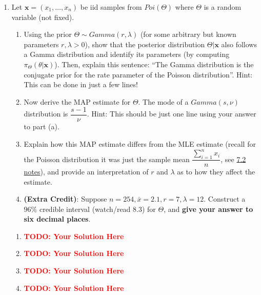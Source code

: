\documentclass[12pt]{article}
\def\todo#1{\textcolor{red}{\textbf{#1}}}
\renewcommand{\|}{\mid}
\begin{document}
\begin{enumerate}
    \item Let $\mathbf{x}=(x_1,\dots,x_n)$ be iid samples from $Poi(\Theta)$ where $\Theta$ is a random variable (not fixed).
    \begin{enumerate}
        \item Using the prior $\Theta\sim Gamma(r,\lambda)$ (for some arbitrary but known parameters $r,\lambda>0$), show that the posterior distribution $\Theta|\mathbf{x}$ also follows a Gamma distribution and identify its parameters (by computing $\pi_{\Theta}(\theta|\mathbf{x})$). Then, explain this sentence: ``The Gamma distribution is the conjugate prior for the rate parameter of the Poisson distribution''. Hint: This can be done in just a few lines!
        \item Now derive the MAP estimate for $\Theta$. The mode of a $Gamma(s, \nu)$ distribution is $\dfrac{s-1}{\nu}$. Hint: This should be just one line using your answer to part (a).
        \item Explain how this MAP estimate differs from the MLE estimate (recall for the Poisson distribution it was just the sample mean $\dfrac{\sum_{i=1}^n{x_i}}{n}$, see \textcolor{blue}{\href{https://courses.cs.washington.edu/courses/cse312/20su/files/student_drive/7.2.pdf}{7.2 notes}}), and provide an interpretation of $r$ and $\lambda$ as to how they affect the estimate. 
        \item \textbf{(Extra Credit)}: Suppose $n=254,\bar{x}=2.1,r=7,\lambda=12$. Construct a $96\%$ credible interval (watch/read 8.3) for $\Theta$, and \textbf{give your answer to six decimal places}. 
    \end{enumerate}
\begin{tcolorbox}
\begin{enumerate}
\item \todo{TODO: Your Solution Here}
\item \todo{TODO: Your Solution Here}
\item \todo{TODO: Your Solution Here}
\item \todo{TODO: Your Solution Here}
\end{enumerate}
\end{tcolorbox}


\end{enumerate}
\end{document}
